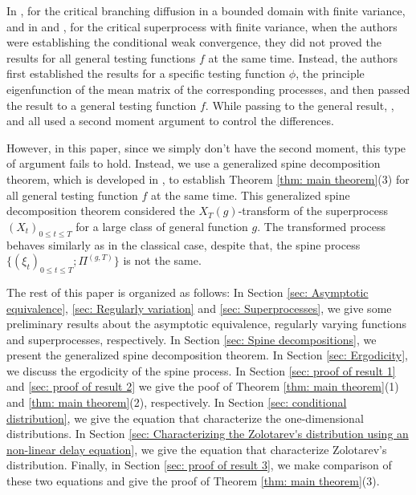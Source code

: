 \documentclass[12pt, a4paper]{amsart}
\theoremstyle{definition}
\numberwithin{equation}{section}
\begin{document}
	In \cite{Powell2015An-invariance}, for the critical branching diffusion in a bounded domain with finite variance, and in \cite{RenSongZhang2015Limit} and \cite{RenSongSun2017Spine}, for the critical superprocess with finite variance, when the authors were establishing the conditional weak convergence, they did not proved the results for all general testing functions $f$ at the same time.
	Instead, the authors first established the results for a specific testing function $\phi$, the principle eigenfunction of the mean matrix of the corresponding processes, and then passed the result to a general testing function $f$. 
	While passing to the general result, \cite{Powell2015An-invariance}, \cite{RenSongZhang2015Limit} and \cite{RenSongSun2017Spine} all used a second moment argument to control the differences.
	
	However, in this paper, since we simply don't have the second moment, this type of argument fails to hold.
	Instead, we use a generalized spine decomposition theorem, which is developed in \cite{RenSongSun2017Spine}, to establish Theorem \ref{thm: main theorem}(3) for all general testing function $f$ at the same time.
	This generalized spine decomposition theorem considered the $X_T(g)$-transform of the superprocess $(X_t)_{0\leq t\leq T}$ for a large class of general function $g$.
	The transformed process behaves similarly as in the classical case, despite that, the spine process $\{(\xi_t)_{0\leq t\leq T}; \Pi^{(g,T)}\}$ is not the same. 
	
	The rest of this paper is organized as follows:  
	In Section \ref{sec: Asymptotic equivalence}, \ref{sec: Regularly variation} and \ref{sec: Superprocesses}, we give some preliminary results about the asymptotic equivalence, regularly varying functions and superprocesses, respectively. 
	In Section \ref{sec: Spine decompositions}, we present the generalized spine decomposition theorem. 
	In Section \ref{sec: Ergodicity}, we discuss the ergodicity of the spine process.
	In Section \ref{sec: proof of result 1} and \ref{sec: proof of result 2} we give the poof of Theorem \ref{thm: main theorem}(1) and \ref{thm: main theorem}(2), respectively. 
	In Section \ref{sec: conditional distribution}, we give the equation that characterize the one-dimensional distributions.
	In Section \ref{sec: Characterizing the Zolotarev's distribution using an non-linear delay equation}, we give the equation that characterize Zolotarev's distribution.
	Finally, in Section \ref{sec: proof of result 3}, we make comparison of these two equations and give the proof of Theorem \ref{thm: main theorem}(3).
\end{document}
